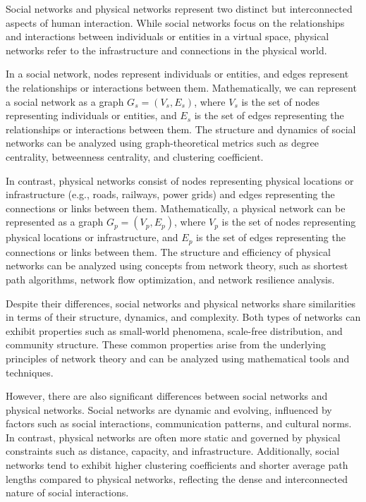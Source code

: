 \documentclass[12pt]{book} %
\begin{document}
Social networks and physical networks represent two distinct but interconnected aspects of human interaction. While social networks focus on the relationships and interactions between individuals or entities in a virtual space, physical networks refer to the infrastructure and connections in the physical world.

In a social network, nodes represent individuals or entities, and edges represent the relationships or interactions between them. Mathematically, we can represent a social network as a graph \( G_s = (V_s, E_s) \), where \( V_s \) is the set of nodes representing individuals or entities, and \( E_s \) is the set of edges representing the relationships or interactions between them. The structure and dynamics of social networks can be analyzed using graph-theoretical metrics such as degree centrality, betweenness centrality, and clustering coefficient.

In contrast, physical networks consist of nodes representing physical locations or infrastructure (e.g., roads, railways, power grids) and edges representing the connections or links between them. Mathematically, a physical network can be represented as a graph \( G_p = (V_p, E_p) \), where \( V_p \) is the set of nodes representing physical locations or infrastructure, and \( E_p \) is the set of edges representing the connections or links between them. The structure and efficiency of physical networks can be analyzed using concepts from network theory, such as shortest path algorithms, network flow optimization, and network resilience analysis.

Despite their differences, social networks and physical networks share similarities in terms of their structure, dynamics, and complexity. Both types of networks can exhibit properties such as small-world phenomena, scale-free distribution, and community structure. These common properties arise from the underlying principles of network theory and can be analyzed using mathematical tools and techniques.

However, there are also significant differences between social networks and physical networks. Social networks are dynamic and evolving, influenced by factors such as social interactions, communication patterns, and cultural norms. In contrast, physical networks are often more static and governed by physical constraints such as distance, capacity, and infrastructure. Additionally, social networks tend to exhibit higher clustering coefficients and shorter average path lengths compared to physical networks, reflecting the dense and interconnected nature of social interactions.
\end{document}
